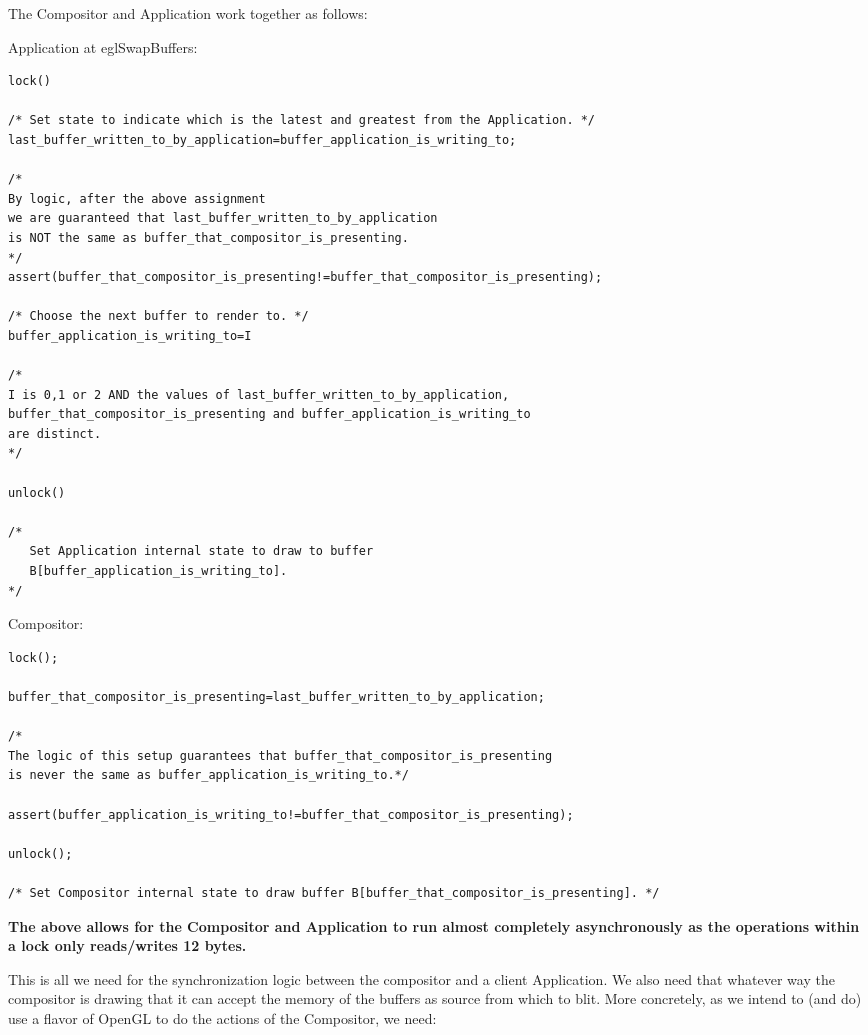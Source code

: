 \documentclass[a4paper,11pt]{article}
\begin{document}
\begin{indenter}{2cm}
The Compositor and Application work together as follows:

Application at eglSwapBuffers:
\begin{verbatim}
lock()

/* Set state to indicate which is the latest and greatest from the Application. */
last_buffer_written_to_by_application=buffer_application_is_writing_to;

/*
By logic, after the above assignment
we are guaranteed that last_buffer_written_to_by_application
is NOT the same as buffer_that_compositor_is_presenting.
*/
assert(buffer_that_compositor_is_presenting!=buffer_that_compositor_is_presenting);

/* Choose the next buffer to render to. */
buffer_application_is_writing_to=I 

/* 
I is 0,1 or 2 AND the values of last_buffer_written_to_by_application,
buffer_that_compositor_is_presenting and buffer_application_is_writing_to 
are distinct.
*/

unlock()

/* 
   Set Application internal state to draw to buffer 
   B[buffer_application_is_writing_to]. 
*/

\end{verbatim}              
              
Compositor:
\begin{verbatim}
lock();

buffer_that_compositor_is_presenting=last_buffer_written_to_by_application;

/*
The logic of this setup guarantees that buffer_that_compositor_is_presenting
is never the same as buffer_application_is_writing_to.*/

assert(buffer_application_is_writing_to!=buffer_that_compositor_is_presenting);

unlock();

/* Set Compositor internal state to draw buffer B[buffer_that_compositor_is_presenting]. */
\end{verbatim}

\textbf{The above allows for the Compositor and Application to run almost completely asynchronously
as the operations within a lock only reads/writes 12 bytes.}

This is all we need for the synchronization logic between the compositor
and a client Application. We also need that whatever way the compositor is drawing
that it can accept the memory of the buffers as source from which to blit. More
concretely, as we intend to (and do) use a flavor of OpenGL to do the actions
of the Compositor, we need:


\end{indenter}
\end{document}
